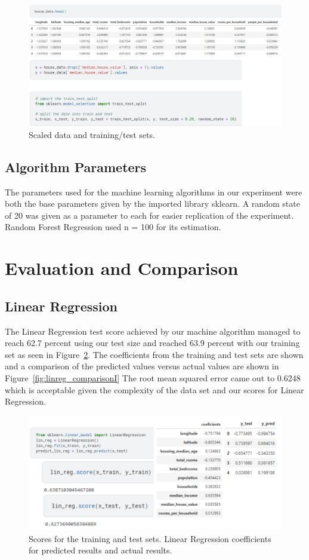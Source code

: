 \documentclass{article}
\begin{document}
\begin{figure}[H]
\includegraphics[width=13.0cm]{Images/preprocessing.png}
\caption{\label{fig:preprocessing}Scaled data and training/test sets.}
\end{figure}

\subsection{Algorithm Parameters}
The parameters used for the machine learning algorithms in our experiment were both the base parameters given by the imported library sklearn. A random state of 20 was given as a parameter to each for easier replication of the experiment. Random Forest Regression used n = 100 for its estimation.

\section{Evaluation and Comparison}

\subsection{Linear Regression}

The Linear Regression test score achieved by our machine algorithm managed to reach 62.7 percent using our test size and reached 63.9 percent with our training set as seen in Figure~\ref{fig:linear_regression}. The coefficients from the training and test sets are shown and a comparison of the predicted values versus actual values are shown in Figure~\ref{fig:linreg_comparisonI} The root mean squared error came out to 0.6248 which is acceptable given the complexity of the data set and our scores for Linear Regression.

\begin{figure}[H]
\includegraphics[width=13.0cm]{Images/linear_regression.png}
\caption{\label{fig:linear_regression}Scores for the training and test sets. Linear Regression coefficients for predicted results and actual results.}
\end{figure}
\end{document}
